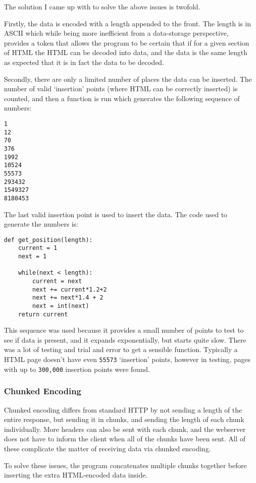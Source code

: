 The solution I came up with to solve the above issues is twofold.\par
Firstly, the data is encoded with a length appended to the front.
The length is in ASCII which while being more inefficient from a data-storage perspective, provides a token that allows the program to be certain that if for a given section of HTML the HTML can be decoded into data, and the data is the same length as expected that it is in fact the data to be decoded.\par
Secondly, there are only a limited number of places the data can be inserted. The number of valid `insertion' points (where HTML can be correctly inserted) is counted, and then a function is run which generates the following sequence of numbers:
\begin{lstlisting}
1
12
70
376
1992
10524
55573
293432
1549327
8180453
\end{lstlisting}
The last valid insertion point is used to insert the data.
The code used to generate the numbers is:
\begin{lstlisting}
def get_position(length):
    current = 1
    next = 1

    while(next < length):
        current = next
        next += current*1.2+2
        next += next*1.4 + 2
        next = int(next)
    return current
\end{lstlisting}
This sequence was used because it provides a small number of points to test to see if data is present, and it expands exponentially, but starts quite slow. There was a lot of testing and trial and error to get a sensible function.
Typically a HTML page doesn't have even \texttt{55573} `insertion' points, however in testing, pages with up to \texttt{300,000} insertion points were found.

\subsubsection{Chunked Encoding}
Chunked encoding differs from standard HTTP by not sending a length of the entire response, but sending it in chunks, and sending the length of each chunk individually.
More headers can also be sent with each chunk, and the webserver does not have to inform the client when all of the chunks have been sent. All of these complicate the matter of receiving data via chunked encoding.\par
To solve these issues, the program concatenates multiple chunks together before inserting the extra HTML-encoded data inside.

